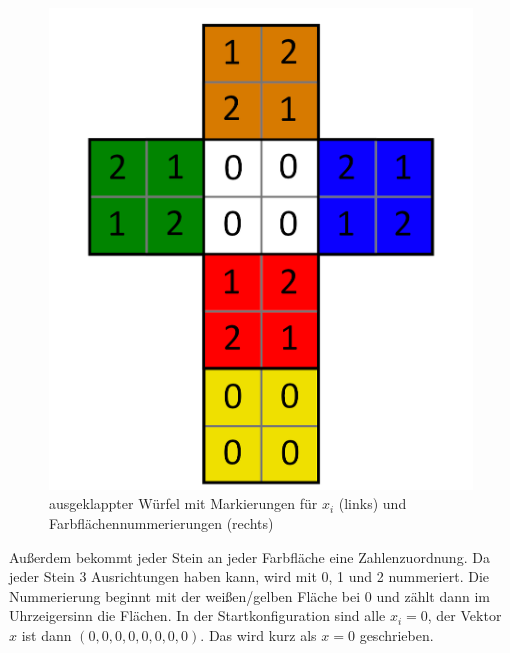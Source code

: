 \documentclass[12pt,a4paper, usenames, dvipsnames]{article}
\theoremstyle{mystyle}
\theoremstyle{definition}
\begin{document}
\begin{figure}[h]
\includegraphics[scale=0.1]{foldedout_012.png}
\caption[Markierungen $x_i$ (links), Farbflächennummern (rechts)]{ausgeklappter Würfel mit Markierungen für $x_i$ (links) und Farbflächennummerierungen (rechts) }
\end{figure}
Außerdem bekommt jeder Stein an jeder Farbfläche eine Zahlenzuordnung. Da jeder Stein 3 Ausrichtungen haben kann, wird mit 0, 1 und 2 nummeriert. Die Nummerierung beginnt mit der weißen/gelben Fläche bei 0 und zählt dann im Uhrzeigersinn die Flächen. 
In der Startkonfiguration sind alle $x_i = 0$, der Vektor $x$ ist dann $(0, 0, 0, 0, 0, 0, 0, 0)$. Das wird kurz als $x=0$ geschrieben.
\end{document}
